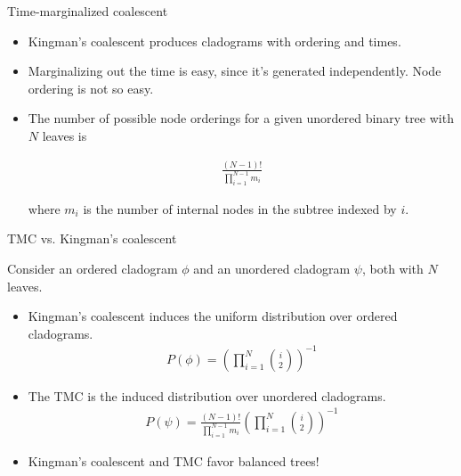 \documentclass[10pt, compress]{beamer}
\begin{document}
\begin{frame}{Time-marginalized coalescent}
  \begin{itemize}
    \item<1->Kingman's coalescent produces
  cladograms with ordering and times.


  \item<2->Marginalizing out the time is easy, since it's
    generated independently. Node ordering
    is not so easy.

\item<3-> The number of possible node orderings for a given unordered
  binary tree with $N$ leaves is

  \begin{align}
    \frac{(N - 1)!}{\prod_{i = 1}^{N - 1} m_i}
  \end{align}

  where $m_i$ is the number of internal nodes in the subtree indexed by $i$.
  \end{itemize}
\end{frame}

\begin{frame}{TMC vs. Kingman's coalescent}

  Consider an ordered cladogram $\phi$
  and an unordered cladogram $\psi$, both with $N$ leaves.

  \begin{itemize}
    \item<1-> Kingman's coalescent induces the uniform
    distribution over ordered cladograms.
    \begin{align*}
      P(\phi) = \left(\prod_{i = 1}^{N}\binom{i}{2}\right)^{-1}
    \end{align*}
    \item<2-> The TMC is the induced
    distribution over unordered cladograms.
    \begin{align*}
      P(\psi) = \frac{(N - 1)!}{\prod_{i = 1}^{N - 1} m_i} \left(\prod_{i = 1}^{N}\binom{i}{2}\right)^{-1}
    \end{align*}
    \item<3-> Kingman's coalescent
      and TMC favor balanced trees!
  \end{itemize}
\end{frame}
\end{document}
